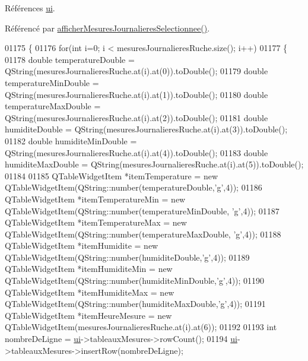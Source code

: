 Références \hyperlink{class_ruche_ihm_a64786058bd7f88ca2f1e9743bb27c25b}{ui}.



Référencé par \hyperlink{class_ruche_ihm_a7f66af552d9e7ba0d00437ff3b330706}{afficher\+Mesures\+Journalieres\+Selectionnee()}.


\begin{DoxyCode}
01175 \{
01176     \textcolor{keywordflow}{for}(\textcolor{keywordtype}{int} i=0; i < mesuresJournalieresRuche.size(); i++)
01177    \{
01178         \textcolor{keywordtype}{double} temperatureDouble = QString(mesuresJournalieresRuche.at(i).at(0)).toDouble();
01179         \textcolor{keywordtype}{double} temperatureMinDouble = QString(mesuresJournalieresRuche.at(i).at(1)).toDouble();
01180         \textcolor{keywordtype}{double} temperatureMaxDouble = QString(mesuresJournalieresRuche.at(i).at(2)).toDouble();
01181         \textcolor{keywordtype}{double} humiditeDouble = QString(mesuresJournalieresRuche.at(i).at(3)).toDouble();
01182         \textcolor{keywordtype}{double} humiditeMinDouble = QString(mesuresJournalieresRuche.at(i).at(4)).toDouble();
01183         \textcolor{keywordtype}{double} humiditeMaxDouble = QString(mesuresJournalieresRuche.at(i).at(5)).toDouble();
01184 
01185         QTableWidgetItem *itemTemperature = \textcolor{keyword}{new} QTableWidgetItem(QString::number(temperatureDouble,\textcolor{charliteral}{'g'},4));
01186         QTableWidgetItem *itemTemperatureMin = \textcolor{keyword}{new} QTableWidgetItem(QString::number(temperatureMinDouble,\textcolor{charliteral}{
      'g'},4));
01187         QTableWidgetItem *itemTemperatureMax = \textcolor{keyword}{new} QTableWidgetItem(QString::number(temperatureMaxDouble,\textcolor{charliteral}{
      'g'},4));
01188         QTableWidgetItem *itemHumidite = \textcolor{keyword}{new} QTableWidgetItem(QString::number(humiditeDouble,\textcolor{charliteral}{'g'},4));
01189         QTableWidgetItem *itemHumiditeMin = \textcolor{keyword}{new} QTableWidgetItem(QString::number(humiditeMinDouble,\textcolor{charliteral}{'g'},4));
01190         QTableWidgetItem *itemHumiditeMax = \textcolor{keyword}{new} QTableWidgetItem(QString::number(humiditeMaxDouble,\textcolor{charliteral}{'g'},4));
01191         QTableWidgetItem *itemHeureMesure = \textcolor{keyword}{new} QTableWidgetItem(mesuresJournalieresRuche.at(i).at(6));
01192 
01193         \textcolor{keywordtype}{int} nombreDeLigne = \hyperlink{class_ruche_ihm_a64786058bd7f88ca2f1e9743bb27c25b}{ui}->tableauxMesures->rowCount();
01194         \hyperlink{class_ruche_ihm_a64786058bd7f88ca2f1e9743bb27c25b}{ui}->tableauxMesures->insertRow(nombreDeLigne);

\end{DoxyCode}
